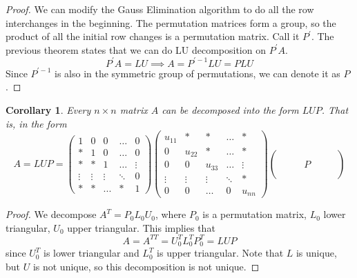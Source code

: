 \documentclass{article}
\newtheorem{corollary}{Corollary}[theorem]
\theoremstyle{remark}
\theoremstyle{definition}
\begin{document}
    \begin{proof}
    We can modify the Gauss Elimination algorithm to do all the row interchanges in the beginning. The permutation matrices form a group, so the product of all the initial row changes is a permutation matrix. Call it $P^\prime$. The previous theorem states that we can do LU decomposition on $P^\prime A$. 
    \[ P^\prime A = LU \implies A = P^{\prime -1} L U = P L U\]
    Since $P^{\prime -1}$ is also in the symmetric group of permutations, we can denote it as $P$. 
    \end{proof}

    \begin{corollary}
    Every $n \times n$ matrix $A$ can be decomposed into the form $L U P$. That is, in the form
    \[ A = L U P = 
    \begin{pmatrix}
    1 & 0 & 0 & \ldots & 0\\
    * & 1 & 0 & \ldots & 0\\
    * & * & 1 & \ldots & \vdots\\
    \vdots & \vdots & \vdots & \ddots & 0\\
    * & * & ... & * & 1 
    \end{pmatrix}
    \begin{pmatrix}
    u_{11} & * & * & \ldots & *\\
    0 & u_{22} & * & \ldots & *\\
    0 & 0 & u_{33} & \ldots & \vdots\\
    \vdots & \vdots & \vdots & \ddots & * \\
    0 & 0 & \ldots & 0 & u_{n n} 
    \end{pmatrix}
    \begin{pmatrix}
    \\
    \\
     & & & P & & & \\
    \\
     & 
    \end{pmatrix}\]
    \end{corollary}

    \begin{proof}
    We decompose $A^T = P_0 L_0 U_0$, where $P_0$ is a permutation matrix, $L_0$ lower triangular, $U_0$ upper triangular. This implies that 
    \[ A = A^{T T} = U_0^T L_0^T P_0^T = L U P\]
    since $U_0^T$ is lower triangular and $L_0^T$ is upper triangular. Note that $L$ is unique, but $U$ is not unique, so this decomposition is not unique. 
    \end{proof}
\end{document}
